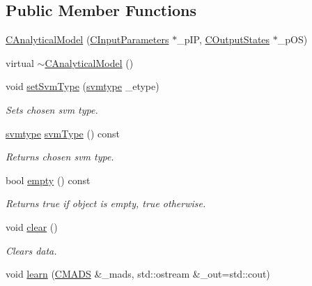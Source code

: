 \subsection*{Public Member Functions}
\begin{DoxyCompactItemize}
\item 
\hyperlink{class_go_s_u_m_1_1_c_analytical_model_a44ebec353f82334ade65e6635360e04d}{C\-Analytical\-Model} (\hyperlink{class_go_s_u_m_1_1_c_input_parameters}{C\-Input\-Parameters} $\ast$\-\_\-p\-I\-P, \hyperlink{class_go_s_u_m_1_1_c_output_states}{C\-Output\-States} $\ast$\-\_\-p\-O\-S)
\item 
virtual \hyperlink{class_go_s_u_m_1_1_c_analytical_model_a8cc6911beea31fccc79fec5dfe857097}{$\sim$\-C\-Analytical\-Model} ()
\item 
void \hyperlink{class_go_s_u_m_1_1_c_analytical_model_a9b8a16c57ed0f46bc06bbff78f7c588d}{set\-Svm\-Type} (\hyperlink{class_go_s_u_m_1_1_c_analytical_model_ad8bee3341d00a0c75e89c1a4376d6fbb}{svmtype} \-\_\-etype)
\begin{DoxyCompactList}\small\item\em Sets chosen svm type. \end{DoxyCompactList}\item 
\hyperlink{class_go_s_u_m_1_1_c_analytical_model_ad8bee3341d00a0c75e89c1a4376d6fbb}{svmtype} \hyperlink{class_go_s_u_m_1_1_c_analytical_model_a368b3443f4b4bf373fcf7c094237eef9}{svm\-Type} () const 
\begin{DoxyCompactList}\small\item\em Returns chosen svm type. \end{DoxyCompactList}\item 
bool \hyperlink{class_go_s_u_m_1_1_c_analytical_model_a47722614e0a971dd937b7ffc570e716c}{empty} () const 
\begin{DoxyCompactList}\small\item\em Returns true if object is empty, true otherwise. \end{DoxyCompactList}\item 
void \hyperlink{class_go_s_u_m_1_1_c_analytical_model_a7d10a35d125be37b30c08410cdebff4a}{clear} ()
\begin{DoxyCompactList}\small\item\em Clears data. \end{DoxyCompactList}\item 
void \hyperlink{class_go_s_u_m_1_1_c_analytical_model_a390911197964f00cdaf79af4d76e7335}{learn} (\hyperlink{class_c_m_a_d_s}{C\-M\-A\-D\-S} \&\-\_\-mads, std\-::ostream \&\-\_\-out=std\-::cout)

\end{DoxyCompactItemize}
